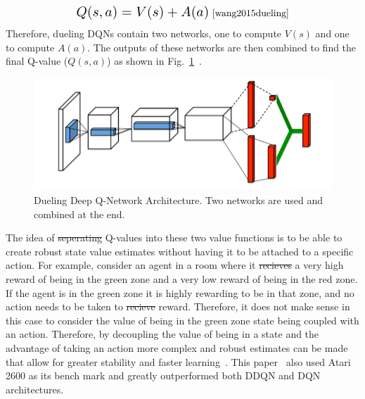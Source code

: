 \documentclass[12pt,american]{report}
\providecommand{\DIFaddtex}[1]{{\protect\color{blue}\uwave{#1}}} %
\providecommand{\DIFdeltex}[1]{{\protect\color{red}\sout{#1}}}                      %
\providecommand{\DIFaddbegin}{} %
\providecommand{\DIFaddend}{} %
\providecommand{\DIFdelbegin}{} %
\providecommand{\DIFdelend}{} %
\providecommand{\DIFadd}[1]{\texorpdfstring{\DIFaddtex{#1}}{#1}} %
\providecommand{\DIFdel}[1]{\texorpdfstring{\DIFdeltex{#1}}{}} %
\newcommand{\DIFscaledelfig}{0.5}
\newlength{\DIFdelgraphicswidth} %
\newlength{\DIFdelgraphicsheight} %
\newcommand{\DIFaddincludegraphics}[2][]{{\color{blue}\fbox{\DIFOincludegraphics[#1]{#2}}}} %
\newcommand{\DIFdelincludegraphics}[2][]{%
\sbox{\DIFdelgraphicsbox}{\DIFOincludegraphics[#1]{#2}}%
\settoboxwidth{\DIFdelgraphicswidth}{\DIFdelgraphicsbox} %
\settoboxtotalheight{\DIFdelgraphicsheight}{\DIFdelgraphicsbox} %
\scalebox{\DIFscaledelfig}{%
\parbox[b]{\DIFdelgraphicswidth}{\usebox{\DIFdelgraphicsbox}\\[-\baselineskip] \rule{\DIFdelgraphicswidth}{0em}}\llap{\resizebox{\DIFdelgraphicswidth}{\DIFdelgraphicsheight}{%
\setlength{\unitlength}{\DIFdelgraphicswidth}%
\begin{picture}(1,1)%
\thicklines\linethickness{2pt} %
{\color[rgb]{1,0,0}\put(0,0){\framebox(1,1){}}}%
{\color[rgb]{1,0,0}\put(0,0){\line( 1,1){1}}}%
{\color[rgb]{1,0,0}\put(0,1){\line(1,-1){1}}}%
\end{picture}%
}\hspace*{3pt}}} %
} %
\DeclareRobustCommand{\DIFaddbegin}{\DIFOaddbegin \let\includegraphics\DIFaddincludegraphics} %
\DeclareRobustCommand{\DIFaddend}{\DIFOaddend \let\includegraphics\DIFOincludegraphics} %
\DeclareRobustCommand{\DIFdelbegin}{\DIFOdelbegin \let\includegraphics\DIFdelincludegraphics} %
\DeclareRobustCommand{\DIFdelend}{\DIFOaddend \let\includegraphics\DIFOincludegraphics} %
\begin{document}
\begin{equation}
          \label{eq:duelingQ}
          \resizebox{0.4\textwidth}{!}{$Q(s,a) = V(s) + A(a)$}~\cite{wang2015dueling}%
\end{equation}
Therefore, dueling DQNs contain two networks, one to compute $V(s)$ and one to compute $A(a)$.  The outputs of these networks are then combined to find the final Q-value ($Q(s,a)$) as shown in Fig.~\ref{fig:duelingDQN}~\cite{wang2015dueling}.

\begin{figure}
\centering
\includegraphics[scale=.85]{images/duelingDQN.png}
\caption{Dueling Deep Q-Network Architecture. Two networks are used and combined at the end.~\cite{wang2015dueling}}
\label{fig:duelingDQN}
\end{figure}

The idea of \DIFdelbegin \DIFdel{seperating }\DIFdelend \DIFaddbegin \DIFadd{separating }\DIFaddend Q-values into these two value functions is to be able to create robust state value estimates without having it to be attached to a specific action.  For example, consider an agent in a room where it \DIFdelbegin \DIFdel{recieves }\DIFdelend \DIFaddbegin \DIFadd{receives }\DIFaddend a very high reward of being in the green zone and a very low reward of being in the red zone. If the agent is in the green zone it is highly rewarding to be in that zone, and no action needs to be taken to \DIFdelbegin \DIFdel{recieve }\DIFdelend \DIFaddbegin \DIFadd{receive }\DIFaddend reward. Therefore, it does not make sense in this case to consider the value of being in the green zone state being coupled with an action. Therefore, by decoupling the value of being in a state and the advantage of taking an action more complex and robust estimates can be made that allow for greater stability and faster learning~\cite{wang2015dueling}. This paper~\cite{wang2015dueling} also used Atari 2600 as its bench mark and greatly outperformed both DDQN and DQN architectures. 
\end{document}
